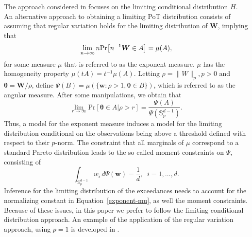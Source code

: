The approach considered in \cite{rootzen2018} focuses on the limiting
    conditional distribution $H$. An alternative approach to obtaining a limiting 
    PoT distribution consists of assuming
    that regular variation \cite[see, for example,][]{resnick2008extreme} holds 
    for the limiting distribution of $\bm{W}$, implying that
    \[
        \lim\limits_{n\rightarrow\infty} n \prob{n^{-1} \bm{W}\in A} = 
        \mu(A),
    \]
    for some measure $\mu$ that is referred to as the exponent measure. 
    $\mu$ has the homogeneity property $\mu(tA) = t^{-1}\mu(A)$. 
    Letting $\rho = \|W\|_p, p>0$ 
    and $\bm{\theta} = \bm{W}/\rho$, define  $\Psi(B) = \mu(\{\bm{w} : \rho>1, 
    \bm{\theta} \in B\})$, which is referred to as the angular measure. After 
    some manipulations, we obtain that
    \begin{equation}
    \label{exponent-mu}
        \lim\limits_{r\rightarrow\infty} 
        \text{Pr}\left[\bm{\theta}\in A \rvert \rho>r\right] = 
            \frac{\Psi(A)}{\Psi({\mathbb S}_p^{d-1})} .
    \end{equation}
    Thus, a model for the exponent measure induces a model for the limiting distribution
    conditional on the observations being above a threshold defined with respect
    to their $p$-norm. The constraint that all marginals of $\mu$ correspond to a
    standard Pareto distribution leads to the so called moment constraints on $\Psi$, consisting
    of
    \[
    \int_{{\mathbb S}_p^{d-1}} w_i \,d\Psi(\bm{w}) = \frac{1}{d}, \;\; i=1, \ldots , d.
    \]
    Inference for the limiting distribution of the exceedances
    needs to account for the normalizing constant in Equation~\eqref{exponent-mu}, as well
    the moment constraints. Because of these issues, in this paper
    we prefer to follow the limiting conditional distribution approach. An example of 
    the application of the regular variation approach, using $p=1$ is developed in \cite{SaNa2014}.

